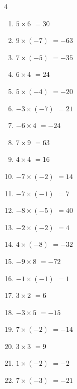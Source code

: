 \begin{multicols}{4}
\begin{enumerate}
  \item $5\times 6$
        $=30$

  \item $9\times (-7)$
        $=-63$

  \item $7\times (-5)$
        $=-35$

  \item $6\times 4$
        $=24$

  \item $5\times (-4)$
        $=-20$

  \item $-3\times (-7)$
        $=21$

  \item $-6\times 4$
        $=-24$

  \item $7\times 9$
        $=63$

  \item $4\times 4$
        $=16$

  \item $-7\times (-2)$
        $=14$

  \item $-7\times (-1)$
        $=7$

  \item $-8\times (-5)$
        $=40$

  \item $-2\times (-2)$
        $=4$

  \item $4\times (-8)$
        $=-32$

  \item $-9\times 8$
        $=-72$

  \item $-1\times (-1)$
        $=1$

  \item $3\times 2$
        $=6$

  \item $-3\times 5$
        $=-15$

  \item $7\times (-2)$
        $=-14$

  \item $3\times 3$
        $=9$

  \item $1\times (-2)$
        $=-2$

  \item $7\times (-3)$
        $=-21$

\end{enumerate}
\end{multicols}

